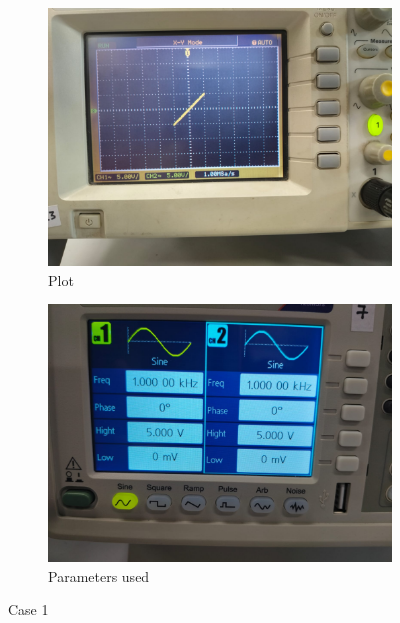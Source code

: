 \documentclass[a4paper,12pt]{article}
\begin{document}
\begin{figure}[htbp]
    \centering
    \begin{subfigure}[b]{0.45\textwidth}
        \centering
        \includegraphics[width=\linewidth]{figs/1/plot1.jpeg}
        \caption{Plot}
        \label{fig:image1}
    \end{subfigure}
    \hfill
    \begin{subfigure}[b]{0.45\textwidth}
        \centering
        \includegraphics[width=\linewidth]{figs/1/para1.jpeg}
        \caption{Parameters used}
        \label{fig:image2}
    \end{subfigure}
    \caption{Case 1}
    \label{fig:sidebyside}
\end{figure}
\end{document}
